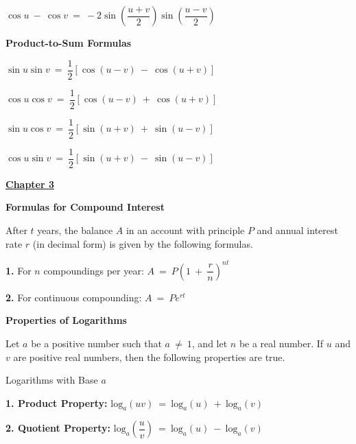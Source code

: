 \documentclass{article}
\begin{document}
\begin{large}
\begin{multicols}{2}
{$\cos u\ -\ \cos v\ =\ -2\sin\left(\dfrac{u+v}{2}\right)\sin\left(\dfrac{u-v}{2}\right)$

\textbf{Product-to-Sum Formulas}

$\sin u \sin v\ =\ \dfrac{1}{2}[\cos(u-v)\ -\ \cos(u+v)]$

$\cos u \cos v\ =\ \dfrac{1}{2}[\cos(u-v)\ +\ \cos(u+v)]$

$\sin u \cos v\ =\ \dfrac{1}{2}[\sin(u+v)\ +\ \sin(u-v)]$

$\cos u \sin v\ =\ \dfrac{1}{2}[\sin(u+v)\ -\ \sin(u-v)]$

}

\end{multicols}

\newpage



\vspace{0.25in}

\underline{\textbf{\huge Chapter 3 \phantom{ } \phantom{ } \phantom{ } \phantom{ }}}

\textbf{Formulas for Compound Interest}

\hspace{0.1in} After $t$ years, the balance $A$ in an account with principle $P$ and annual interest rate $r$ (in decimal form) is given by the following formulas.

\hspace{0.2in} \textbf{1.} For $n$ compoundings per year: $A\ =\ P\left(1\ +\ \dfrac{r}{n}\right)^{nt}$

\hspace{0.2in} \textbf{2.} For continuous compounding: $A\ =\ Pe^{rt}$

\textbf{Properties of Logarithms}

\hspace{0.1in} Let $a$ be a positive number such that $a\ \neq\ 1$, and let $n$ be a real number.  If $u$ and $v$ are positive real numbers, then the following properties are true.

\hspace{0.1in} Logarithms with Base $a$

\hspace{0.2in} \textbf{1. Product Property:} $\text{log}_{a}\left(uv\right)\ =\ \text{log}_{a}(u)\ +\ \text{log}_{a}(v)$

\hspace{0.2in} \textbf{2. Quotient Property:} $\text{log}_{a}\left(\dfrac{u}{v}\right)\ =\ \text{log}_{a}(u)\ -\ \text{log}_{a}(v)$


\end{large}
\end{document}
